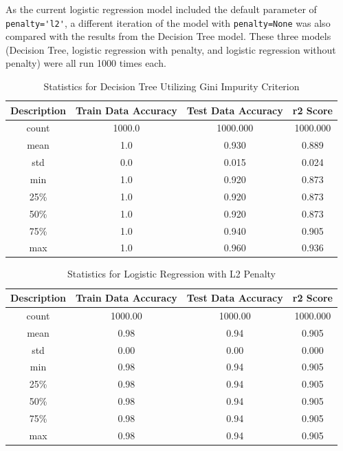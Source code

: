 \documentclass[journal]{IEEEtran}
\begin{document}
As the current logistic regression model included the default parameter of \lstinline{penalty='l2'}, a different iteration of the model with \lstinline{penalty=None} was also compared with the results from the Decision Tree model. These three models (Decision Tree, logistic regression with penalty, and logistic regression without penalty) were all run 1000 times each. 

\begin{table}[h!]
\centering
\begin{tabular}{ c | c c c }
    Description & Train Data Accuracy & Test Data Accuracy & r2 Score \\
\hline
count   &            1000.0   &      1000.000 &  1000.000\\
mean    &               1.0   &         0.930 &     0.889\\
std     &               0.0   &         0.015 &     0.024\\
min     &               1.0   &         0.920 &     0.873\\
25\%    &                1.0  &          0.920 &     0.873\\
50\%    &                1.0  &          0.920 &     0.873\\
75\%    &                1.0  &          0.940 &     0.905\\
max     &               1.0   &         0.960 &     0.936\\
\end{tabular}
\caption{Statistics for Decision Tree Utilizing Gini Impurity Criterion}
\label{table:dtGI}
\end{table}

\begin{table}[h!]
\centering
\begin{tabular}{ c | c c c }
    Description & Train Data Accuracy & Test Data Accuracy & r2 Score \\
\hline
count       &       1000.00    &         1000.00&  1000.000 \\
mean        &          0.98    &            0.94&     0.905 \\
std         &          0.00    &            0.00&     0.000 \\
min         &          0.98    &            0.94 &    0.905 \\
25\%        &           0.98   &             0.94 &    0.905 \\
50\%        &           0.98   &             0.94 &    0.905 \\
75\%        &           0.98   &             0.94 &    0.905 \\
max         &          0.98    &            0.94  &   0.905 \\
\end{tabular}
\caption{Statistics for Logistic Regression with L2 Penalty}
\label{table:logRegL2}
\end{table}
\end{document}
